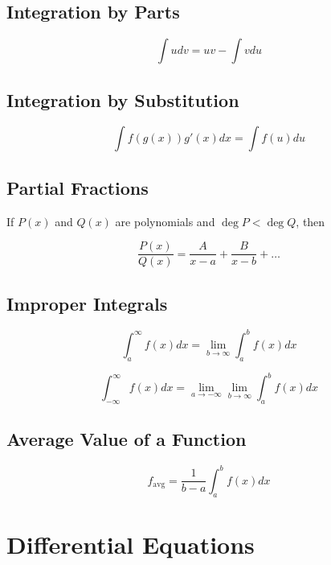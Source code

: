 \documentclass[12pt]{article}
\begin{document}
\subsection*{Integration by Parts}
\begin{equation}
  \int u dv = uv - \int v du
\end{equation}

\subsection*{Integration by Substitution}
\begin{equation}
  \int f(g(x)) g'(x) dx = \int f(u) du
\end{equation}

\subsection*{Partial Fractions}

If $P(x)$ and $Q(x)$ are polynomials and $\deg P < \deg Q$, then

\begin{equation}
  \frac{P(x)}{Q(x)} = \frac{A}{x-a} + \frac{B}{x-b} + \ldots
\end{equation}

\subsection*{Improper Integrals}

\begin{equation}
  \int_{a}^{\infty} f(x) dx = \lim_{b \to \infty} \int_{a}^{b} f(x) dx
\end{equation}

\begin{equation}
  \int_{-\infty}^{\infty} f(x) dx = \lim_{a \to -\infty} \lim_{b \to \infty} \int_{a}^{b} f(x) dx
\end{equation}

\subsection*{Average Value of a Function}

\begin{equation}
  f_{\text{avg}} = \frac{1}{b-a} \int_{a}^{b} f(x) dx
\end{equation}

\section{Differential Equations}
\end{document}
